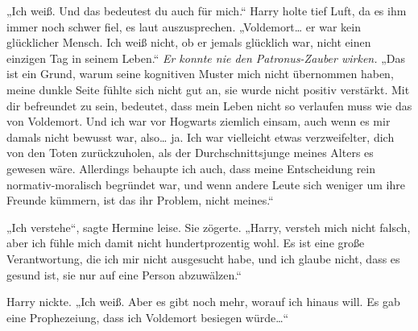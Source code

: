 „Ich weiß. Und das bedeutest du auch für mich.“
Harry holte tief Luft, da es ihm immer noch schwer fiel, es laut auszusprechen.
„Voldemort… er war kein glücklicher Mensch. Ich weiß nicht, ob er jemals glücklich war, nicht einen einzigen Tag in seinem Leben.“
\emph{Er konnte nie den Patronus-Zauber wirken.}
„Das ist ein Grund, warum seine kognitiven Muster mich nicht übernommen haben, meine dunkle Seite fühlte sich nicht gut an, sie wurde nicht positiv verstärkt. Mit dir befreundet zu sein, bedeutet, dass mein Leben nicht so verlaufen muss wie das von Voldemort. Und ich war vor Hogwarts ziemlich einsam, auch wenn es mir damals nicht bewusst war, also… ja. Ich war vielleicht etwas verzweifelter, dich von den Toten zurückzuholen, als der Durchschnittsjunge meines Alters es gewesen wäre. Allerdings behaupte ich auch, dass meine Entscheidung rein normativ-moralisch begründet war, und wenn andere Leute sich weniger um ihre Freunde kümmern, ist das ihr Problem, nicht meines.“

„Ich verstehe“, sagte Hermine leise. Sie zögerte. „Harry, versteh mich nicht falsch, aber ich fühle mich damit nicht hundertprozentig wohl. Es ist eine große Verantwortung, die ich mir nicht ausgesucht habe, und ich glaube nicht, dass es gesund ist, sie nur auf eine Person abzuwälzen.“

Harry nickte.
„Ich weiß. Aber es gibt noch mehr, worauf ich hinaus will. Es gab eine Prophezeiung, dass ich Voldemort besiegen würde…“

